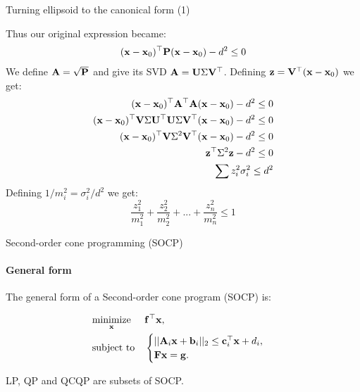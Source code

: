 \documentclass{beamer}
\begin{document}
\begin{frame}{Turning ellipsoid to the canonical form (1)}
	\begin{flushleft}
		
		Thus our original expression became:
		\begin{align}
			(\mathbf{x} - \mathbf{x}_0)^\top \mathbf{P}(\mathbf{x} - \mathbf{x}_0) - d^2 \leq 0
		\end{align}
		We define $\mathbf{A} = \sqrt{\mathbf{P}}$ and give its SVD $\mathbf{A} = \mathbf{U} \Sigma \mathbf{V}^\top$. Defining $\mathbf{z} = \mathbf{V}^\top (\mathbf{x} - \mathbf{x}_0)$ we get:
	\begin{align}
		(\mathbf{x} - \mathbf{x}_0)^\top \mathbf{A}^\top\mathbf{A}(\mathbf{x} - \mathbf{x}_0) - d^2 \leq 0 
		\\
		(\mathbf{x} - \mathbf{x}_0)^\top  \mathbf{V} \Sigma \mathbf{U}^\top  \mathbf{U} \Sigma \mathbf{V}^\top(\mathbf{x} - \mathbf{x}_0) - d^2 \leq 0 
		\\
		(\mathbf{x} - \mathbf{x}_0)^\top  \mathbf{V} \Sigma^2 \mathbf{V}^\top(\mathbf{x} - \mathbf{x}_0) - d^2 \leq 0
		\\
		\mathbf{z}^\top   \Sigma^2 \mathbf{z} - d^2 \leq 0
		\\
		\sum z_i^2 \sigma_i^2  \leq d^2
	\end{align}
%
Defining $1/m_i^2 = \sigma_i^2 / d^2$ we get:
%
\begin{equation}
	\frac{z_1^2}{m_1^2} + \frac{z_2^2}{m_2^2} + ... + 
	\frac{z_n^2}{m_n^2} \leq 1
\end{equation}
		
	\end{flushleft}
\end{frame}




\begin{frame}{Second-order cone programming (SOCP)}
\framesubtitle{General form}
\begin{flushleft}


The general form of a Second-order cone program (SOCP) is:

%
\begin{equation}
\begin{aligned}
& \underset{\mathbf{x}}{\text{minimize}}
& & \mathbf{f}^\top\mathbf{x}, \\
& \text{subject to}
& & \begin{cases}
    ||\mathbf{A}_i\mathbf{x} + \mathbf{b}_i||_2 \leq 
     \mathbf{c}_i^\top \mathbf{x} + d_i, \\
    \mathbf{F}\mathbf{x} = \mathbf{g}.
    \end{cases}
\end{aligned}
\end{equation}

LP, QP and QCQP are subsets of SOCP.
 
\end{flushleft}
\end{frame}
\end{document}
